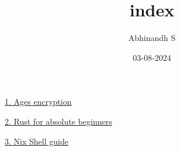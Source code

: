 \documentclass[11pt]{article}
\author{Abhinandh S}
\date{03-08-2024}
\title{index}
\begin{document}
\maketitle
\tableofcontents

\href{articles/ages.org}{1. Ages encryption}

\href{articles/rust.org}{2. Rust for absolute beginners}

\href{articles/nix-shell.org}{3. Nix Shell guide}
\end{document}
